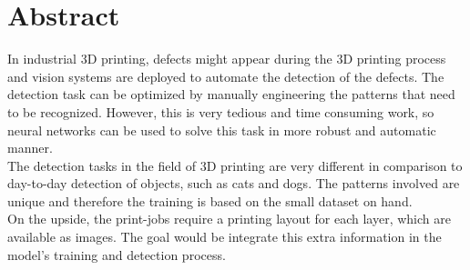 \section*{Abstract}
In industrial 3D printing, defects might appear during the 3D printing process and vision systems are deployed to automate the detection of the defects. The detection task can be optimized by manually engineering the patterns that need to be recognized. However, this is very tedious and time consuming work, so neural networks can be used to solve this task in more robust and automatic manner. \\
The detection tasks in the field of 3D printing are very different in comparison to day-to-day detection of objects, such as cats and dogs. The patterns involved are unique and therefore the training is based on the small dataset on hand. \\
On the upside, the print-jobs require a printing layout for each layer, which are available as images. The goal would be integrate this extra information in the model's training and detection process. \\

\cleardoublepage{}
